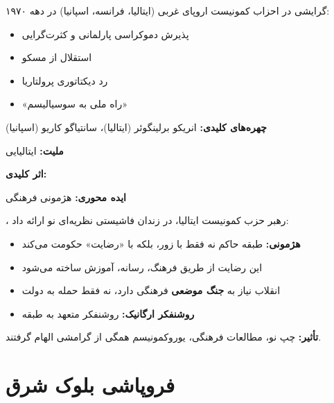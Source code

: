 \begin{defbox}
گرایشی در احزاب کمونیست اروپای غربی (ایتالیا، فرانسه، اسپانیا) در دهه ۱۹۷۰:
\begin{itemize}[nosep]
    \item پذیرش دموکراسی پارلمانی و کثرت‌گرایی
    \item استقلال از مسکو
    \item رد دیکتاتوری پرولتاریا
    \item «راه ملی به سوسیالیسم»
\end{itemize}
\textbf{چهره‌های کلیدی:} انریکو برلینگوئر (ایتالیا)، سانتیاگو کاریو (اسپانیا)
\end{defbox}

\begin{personbox}

\textbf{ملیت:} ایتالیایی

\textbf{اثر کلیدی:} 

\textbf{ایده محوری:} هژمونی فرهنگی

\mediumspace

، رهبر حزب کمونیست ایتالیا، در زندان فاشیستی نظریه‌ای نو ارائه داد:
\begin{itemize}[nosep]
    \item \textbf{هژمونی:} طبقه حاکم نه فقط با زور، بلکه با «رضایت» حکومت می‌کند
    \item این رضایت از طریق فرهنگ، رسانه، آموزش ساخته می‌شود
    \item انقلاب نیاز به \textbf{جنگ موضعی} فرهنگی دارد، نه فقط حمله به دولت
    \item \textbf{روشنفکر ارگانیک:} روشنفکر متعهد به طبقه
\end{itemize}

\mediumspace

\textbf{تأثیر:} چپ نو، مطالعات فرهنگی، یوروکمونیسم همگی از گرامشی الهام گرفتند.
\end{personbox}

\section{فروپاشی بلوک شرق}

